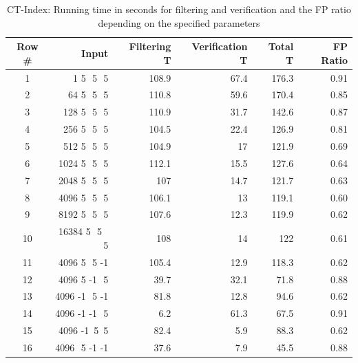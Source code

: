 \documentclass{l4proj}
\begin{document}
\newcommand\TstrutT{\rule{0pt}{2.6ex}}         %
\newcommand\Bstrut{\rule[-1ex]{0pt}{0pt}} 

\begin{table}
\begin{center}
\renewcommand{\arraystretch}{1.2}%
\begin{tabular}{ |c|r|r|r|r|r|}\hline
 Row \# & Input & Filtering T& Verification T& Total T& FP Ratio\\
 \hline
  1 & 1 5 \,\,5 \,\,5 & 108.9  & 67.4 & 176.3 & 0.91 \\
 \hline
  2 & 64 5 \,\,5 \,\,5 & 110.8 & 59.6 & 170.4 & 0.85 \\
 \hline
  3 & 128 5 \,\,5 \,\,5 & 110.9 & 31.7 & 142.6 & 0.87 \\
 \hline
  4 & 256 5 \,\,5 \,\,5 & 104.5 & 22.4 & 126.9 & 0.81 \\
 \hline
  5 & 512 5 \,\,5 \,\,5 & 104.9 & 17 & 121.9 & 0.69 \\
 \hline
  6 & 1024 5 \,\,5 \,\,5 & 112.1 & 15.5 & 127.6 & 0.64 \\
 \hline
  7 & 2048 5 \,\,5 \,\,5 & 107 & 14.7 & 121.7 & 0.63 \\
 \hline
  8 & 4096 5 \,\,5 \,\,5 & 106.1 & 13 & 119.1 & 0.60 \\
 \hline
  9 & 8192 5 \,\,5 \,\,5 & 107.6 & 12.3 & 119.9 & 0.62 \\
 \hline
  10 & 16384 5 \,\,5 \,\,5 & 108 & 14 & 122 & 0.61 \\
 \hline
  11 & 4096 5 \,\,5 -1 & 105.4 & 12.9 & 118.3 & 0.62 \\
 \hline
  12 & 4096 5 -1 \,\,5 & 39.7 & 32.1 & 71.8 & 0.88 \\
 \hline
  13 & 4096 -1 \,\,5 -1 & 81.8 & 12.8 & 94.6 & 0.62 \\
 \hline
  14 & 4096 -1 -1 \,\,5 & 6.2 & 61.3 & 67.5 & 0.91 \\
 \hline 
  15 & 4096 -1 \,5 \,5  & 82.4 & 5.9 & 88.3 & 0.62\\ 
 \hline
  16 & 4096 \,\,5 -1 -1 & 37.6  & 7.9 & 45.5 & 0.88 \\ 
 \hline 
\end{tabular}
\caption{CT-Index: Running time in seconds for filtering and verification and the FP ratio depending on the specified parameters}
\label{table:runningTime}
\end{center}
\end{table}
\end{document}
